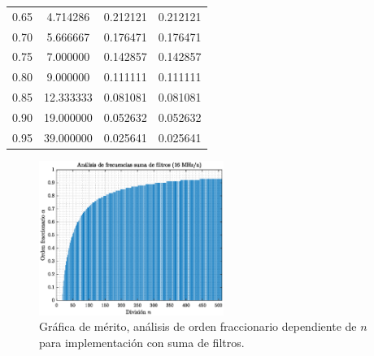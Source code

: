 \documentclass[10pt]{beamer}
\begin{document}
\begin{frame}
\begin{minipage}[b]{0.45\textwidth}
\begin{tiny}
\begin{table}[!hbp]
\begin{tabular}{cccc}
			0.65 & 4.714286 & 0.212121 & 0.212121 \\ 
			                                   
			0.70 & 5.666667 & 0.176471 & 0.176471 \\ 
			                                  
			0.75 & 7.000000 & 0.142857 & 0.142857 \\ 
			                                   
			0.80 & 9.000000 & 0.111111 & 0.111111 \\ 
			                                 
			0.85 & 12.333333 & 0.081081 & 0.081081 \\
			                                  
			0.90 & 19.000000 & 0.052632 & 0.052632 \\
			                                  
			0.95 & 39.000000 & 0.025641 & 0.025641 \\
			\hline                                              
			\end{tabular}                                                                
	\end{table}
			\end{tiny}
		\end{minipage} \hfill \begin{minipage}[b]{0.45\textwidth}
			\begin{figure}[hbtp]
		\caption{Gráfica de mérito, análisis de orden fraccionario dependiente de $n$ para implementación con suma de filtros.} 
		\label{fig:T12_Analisis_de_frecuencias_suma_de_filtros}
		\centering
		\includegraphics[width=6cm]{../imagenes/T12_Analisis_de_frecuencias_suma_de_filtros.eps}
	\end{figure}
		\end{minipage}
	\end{frame}
\end{document}
